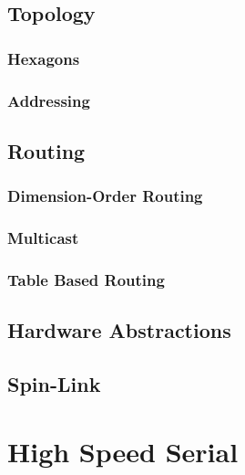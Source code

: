 		\subsection{Topology}
			
			\subsubsection{Hexagons}
			
			\subsubsection{Addressing}
		
		\subsection{Routing}
			
			\subsubsection{Dimension-Order Routing}
			
			\subsubsection{Multicast}
			
			\subsubsection{Table Based Routing}
		
		\subsection{Hardware Abstractions}
		
		\subsection{Spin-Link}
	
	
	\section{High Speed Serial}

